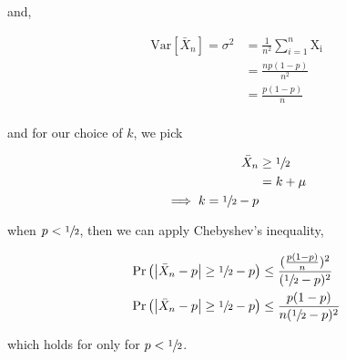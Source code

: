 \documentclass[letterpaper,10pt]{article} %
\newcommand{\pr}[1]{\Pr\left( #1 \right)}
\begin{document}
and,

\begin{align*}
\mathrm{Var}\left[ \bar{X}_n \right] = \sigma^2 &= \frac{1}{n^2} \sum_{i=1}^n\mathrm{X_i} \\
&= \frac{np(1-p)}{n^2} \\
&= \frac{p(1-p)}{n} \\
\end{align*}

and for our choice of $k$, we pick

\begin{align*}
\bar{X}_n &\geq \sfrac{1}{2} \\
&= k+\mu \\
\implies k = \sfrac{1}{2}-p
\end{align*}

when $p < \sfrac{1}{2}$, then we can apply Chebyshev's inequality,

\begin{align*}
\pr{\left|\bar{X}_n - p\right| \geq \sfrac{1}{2}-p} &\leq \frac{(\frac{p(1-p)}{n})^2}{(\sfrac{1}{2}-p)^2}\\
\pr{\left|\bar{X}_n - p\right| \geq \sfrac{1}{2}-p} &\leq \frac{p(1-p)}{n(\sfrac{1}{2}-p)^2} \\
\end{align*}

which holds for only for $p<\sfrac{1}{2}$.

%
%

\end{document}
